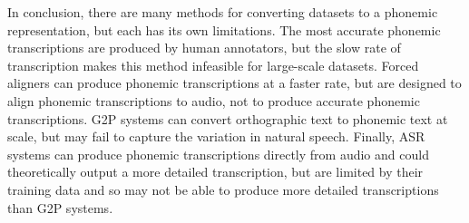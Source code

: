 In conclusion, there are many methods for converting datasets to a phonemic representation, but each has its own limitations. The most accurate phonemic transcriptions are produced by human annotators, but the slow rate of transcription makes this method infeasible for large-scale datasets. Forced aligners can produce phonemic transcriptions at a faster rate, but are designed to align phonemic transcriptions to audio, not to produce accurate phonemic transcriptions. G2P systems can convert orthographic text to phonemic text at scale, but may fail to capture the variation in natural speech. Finally, ASR systems can produce phonemic transcriptions directly from audio and could theoretically output a more detailed transcription, but are limited by their training data and so may not be able to produce more detailed transcriptions than G2P systems.








